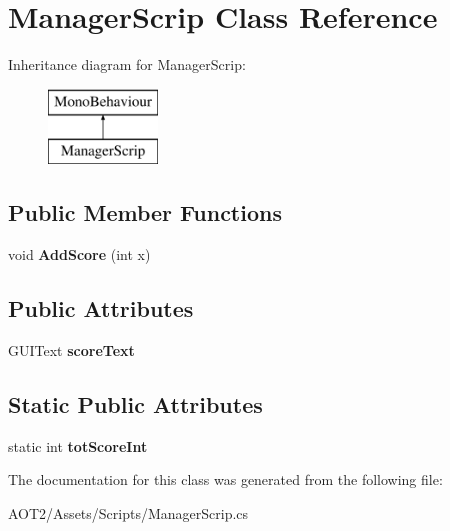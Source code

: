 \hypertarget{class_manager_scrip}{}\section{Manager\+Scrip Class Reference}
\label{class_manager_scrip}
Inheritance diagram for Manager\+Scrip\+:\begin{figure}[H]
\begin{center}
\leavevmode
\includegraphics[height=2.000000cm]{class_manager_scrip}
\end{center}
\end{figure}
\subsection*{Public Member Functions}
\begin{DoxyCompactItemize}
\item 
\hypertarget{class_manager_scrip_a44177d26694eced8c1f72ba14ba9b0a6}{}void {\bfseries Add\+Score} (int x)\label{class_manager_scrip_a44177d26694eced8c1f72ba14ba9b0a6}

\end{DoxyCompactItemize}
\subsection*{Public Attributes}
\begin{DoxyCompactItemize}
\item 
\hypertarget{class_manager_scrip_a08b542ecf690456e3dad0aa2824cac1a}{}G\+U\+I\+Text {\bfseries score\+Text}\label{class_manager_scrip_a08b542ecf690456e3dad0aa2824cac1a}

\end{DoxyCompactItemize}
\subsection*{Static Public Attributes}
\begin{DoxyCompactItemize}
\item 
\hypertarget{class_manager_scrip_ab1fd8dd95add5e61275e511e72f8e94d}{}static int {\bfseries tot\+Score\+Int}\label{class_manager_scrip_ab1fd8dd95add5e61275e511e72f8e94d}

\end{DoxyCompactItemize}


The documentation for this class was generated from the following file\+:\begin{DoxyCompactItemize}
\item 
A\+O\+T2/\+Assets/\+Scripts/Manager\+Scrip.\+cs\end{DoxyCompactItemize}
